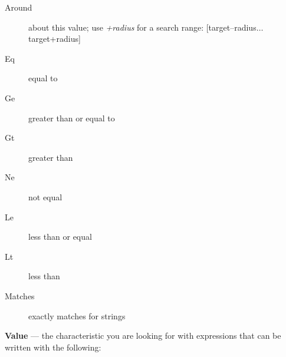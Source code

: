\begin{description}
\begin{description}
        \item[Around]	about this value; use \textit{+radius} for a search range: [target–radius$\dots$  target+radius]
        \item[Eq	]	equal to
        \item[Ge]	greater than or equal to
        \item[Gt]	greater than
        \item[Ne]not equal
        \item[Le]	less than or equal
        \item[Lt] less than
        \item[Matches]	exactly matches for strings
    \end{description}
\end{description}

\textbf{Value} --- the characteristic you are looking for with expressions that can be written with the following:

